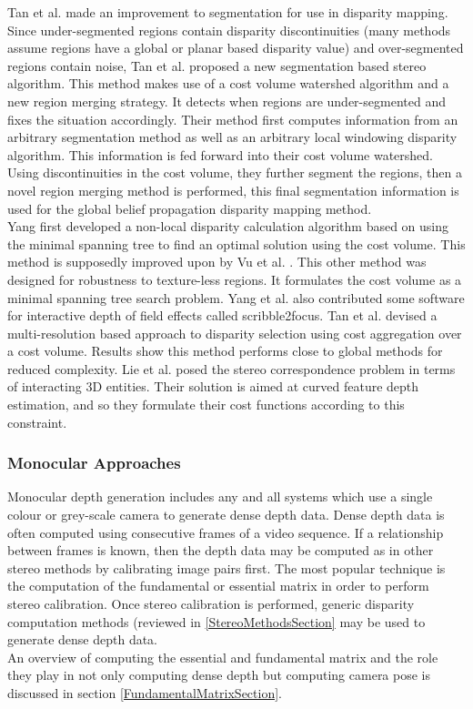 Tan et al. \cite{Tan14Stereo} made an improvement to segmentation for use in disparity mapping. Since under-segmented regions contain disparity discontinuities (many methods assume regions have a global or planar based disparity value) and over-segmented regions contain noise, Tan et al. proposed a new segmentation based stereo algorithm. This method makes use of a cost volume watershed algorithm and a new region merging strategy. It detects when regions are under-segmented and fixes the situation accordingly. Their method first computes information from an arbitrary segmentation method as well as an arbitrary local windowing disparity algorithm. This information is fed forward into their cost volume watershed. Using discontinuities in the cost volume, they further segment the regions, then a novel region merging method is performed, this final segmentation information is used for the global belief propagation disparity mapping method. \\


Yang \cite{Yang14Pattern} first developed a non-local disparity calculation algorithm based on using the minimal spanning tree to find an optimal solution using the cost volume. This method is supposedly improved upon by Vu et al. \cite{Vu14Efficient}. This other method was designed for robustness to texture-less regions. It formulates the cost volume as a minimal spanning tree search problem. Yang et al. also contributed some software for interactive depth of field effects called scribble2focus. Tan et al. \cite{Tan14Soft} devised a multi-resolution based approach to disparity selection using cost aggregation over a cost volume. Results show this method performs close to global methods for reduced complexity. Lie et al. \cite{Liu143d} posed the stereo correspondence problem in terms of interacting 3D entities. Their solution is aimed at curved feature depth estimation, and so they formulate their cost functions according to this constraint. \\



\subsubsection{Monocular Approaches}

Monocular depth generation includes any and all systems which use a single colour or grey-scale camera to generate dense depth data. Dense depth data is often computed using consecutive frames of a video sequence. If a relationship between frames is known, then the depth data may be computed as in other stereo methods by calibrating image pairs first. The most popular technique is the computation of the fundamental or essential matrix in order to perform stereo calibration. Once stereo calibration is performed, generic disparity computation methods (reviewed in \ref{StereoMethodsSection} may be used to generate dense depth data. \\

An overview of computing the essential and fundamental matrix and the role they play in not only computing dense depth but computing camera pose is discussed in section \ref{FundamentalMatrixSection}. 

